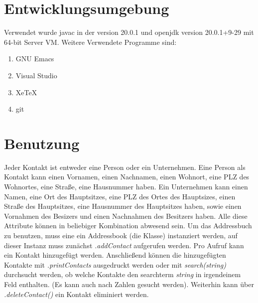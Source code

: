 \documentclass{article}
\begin{document}
\section{Entwicklungsumgebung}
Verwendet wurde javac in der version 20.0.1
und openjdk version 20.0.1+9-29 mit 64-bit Server VM.
Weitere Verwendete Programme sind:
\begin{enumerate}
\item GNU Emacs
\item Visual Studio
\item XeTeX
\item git
\end{enumerate}
\section{Benutzung}
Jeder Kontakt ist entweder eine Person oder ein Unternehmen.
Eine Person als Kontakt kann einen Vornamen, einen Nachnamen, einen Wohnort,
eine PLZ des Wohnortes, eine Straße, eine Hausnummer haben.
Ein Unternehmen kann einen Namen, eine Ort des Hauptsitzes, eine PLZ des Ortes
des Hauptsizes, einen Straße des Hauptsitzes, eine Hausnummer des Hauptsitzes
haben, sowie einen Vornahmen des Besizers und einen Nachnahmen des Besitzers
haben. Alle diese Attribute können in beliebiger Kombination abwesend sein. 
Um das Addressbuch zu benutzen, muss eine ein Addressbook (die Klasse)
instanziert werden, auf dieser Instanz muss zunächst \textit{.addContact}
aufgerufen werden. Pro Aufruf kann ein Kontakt hinzugefügt werden.
Anschließend können die hinzugefügten Kontakte mit \textit{.printContacts}
ausgedruckt werden oder mit \textit{search(string)} durchsucht werden, ob
welche Kontakte den searchterm \textit{string} in irgendeinem Feld
enthalten. (Es kann auch nach Zahlen gesucht werden).
Weiterhin kann über \textit{.deleteContact()} ein Kontakt eliminiert werden.
\end{document}
